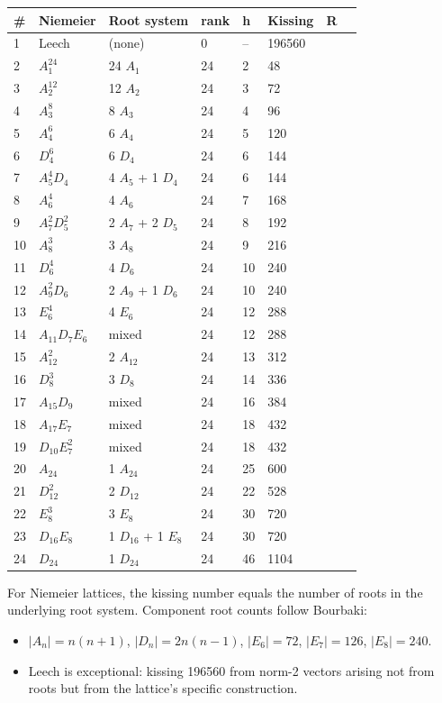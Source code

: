 \documentclass[11pt,reqno]{amsart}
\theoremstyle{plain}
\theoremstyle{definition}
\begin{document}
\begin{center}
\begin{tabular}{llllllll}
\toprule
# & Niemeier & Root system & rank & h & Kissing & R &  \\
\midrule
1 & Leech & (none) & 0 & – & 196560 &  &  \\
2 & $A_1^{24}$ & 24 $A_1$ & 24 & 2 & 48 &  &  \\
3 & $A_2^{12}$ & 12 $A_2$ & 24 & 3 & 72 &  &  \\
4 & $A_3^8$ & 8 $A_3$ & 24 & 4 & 96 &  &  \\
5 & $A_4^6$ & 6 $A_4$ & 24 & 5 & 120 &  &  \\
6 & $D_4^6$ & 6 $D_4$ & 24 & 6 & 144 &  &  \\
7 & $A_5^4 D_4$ & 4 $A_5$ + 1 $D_4$ & 24 & 6 & 144 &  &  \\
8 & $A_6^4$ & 4 $A_6$ & 24 & 7 & 168 &  &  \\
9 & $A_7^2 D_5^2$ & 2 $A_7$ + 2 $D_5$ & 24 & 8 & 192 &  &  \\
10 & $A_8^3$ & 3 $A_8$ & 24 & 9 & 216 &  &  \\
11 & $D_6^4$ & 4 $D_6$ & 24 & 10 & 240 &  &  \\
12 & $A_9^2 D_6$ & 2 $A_9$ + 1 $D_6$ & 24 & 10 & 240 &  &  \\
13 & $E_6^4$ & 4 $E_6$ & 24 & 12 & 288 &  &  \\
14 & $A_{11} D_7 E_6$ & mixed & 24 & 12 & 288 &  &  \\
15 & $A_{12}^2$ & 2 $A_{12}$ & 24 & 13 & 312 &  &  \\
16 & $D_8^3$ & 3 $D_8$ & 24 & 14 & 336 &  &  \\
17 & $A_{15} D_9$ & mixed & 24 & 16 & 384 &  &  \\
18 & $A_{17} E_7$ & mixed & 24 & 18 & 432 &  &  \\
19 & $D_{10} E_7^2$ & mixed & 24 & 18 & 432 &  &  \\
20 & $A_{24}$ & 1 $A_{24}$ & 24 & 25 & 600 &  &  \\
21 & $D_{12}^2$ & 2 $D_{12}$ & 24 & 22 & 528 &  &  \\
22 & $E_8^3$ & 3 $E_8$ & 24 & 30 & 720 &  &  \\
23 & $D_{16} E_8$ & 1 $D_{16}$ + 1 $E_8$ & 24 & 30 & 720 &  &  \\
24 & $D_{24}$ & 1 $D_{24}$ & 24 & 46 & 1104 &  &  \\
\bottomrule
\end{tabular}
\end{center}

For Niemeier lattices, the kissing number equals the number of roots in the underlying root system. Component root counts follow Bourbaki:
\begin{itemize}
\item $|A_n| = n(n+1)$, $|D_n| = 2n(n-1)$, $|E_6| = 72$, $|E_7| = 126$, $|E_8| = 240$.
\item Leech is exceptional: kissing 196560 from norm-2 vectors arising not from roots but from the lattice's specific construction.
\end{itemize}
\end{document}

